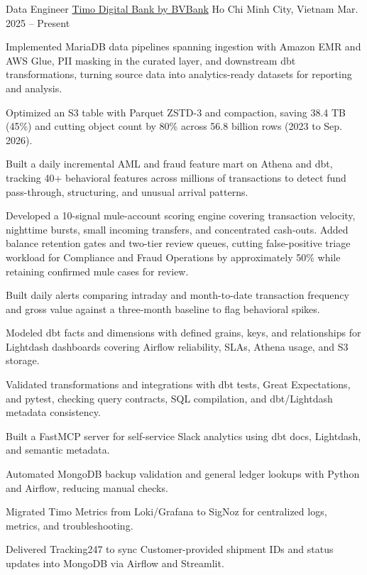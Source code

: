 
\begin{cventries}
  \cventry
    {Data Engineer}
    {\href{https://timo.vn}{Timo Digital Bank by BVBank}}
    {Ho Chi Minh City, Vietnam}
    {Mar. 2025 -- Present}
    {
      \begin{cvitems}
        \item {Implemented MariaDB data pipelines spanning ingestion with Amazon EMR and AWS Glue, PII masking in the curated layer, and downstream dbt transformations, turning source data into analytics-ready datasets for reporting and analysis.}
        \item {Optimized an S3 table with Parquet ZSTD-3 and compaction, saving 38.4 TB (45\%) and cutting object count by 80\% across 56.8 billion rows (2023 to Sep. 2026).}
        \item {Built a daily incremental AML and fraud feature mart on Athena and dbt, tracking 40+ behavioral features across millions of transactions to detect fund pass-through, structuring, and unusual arrival patterns.}
        \item {Developed a 10-signal mule-account scoring engine covering transaction velocity, nighttime bursts, small incoming transfers, and concentrated cash-outs. Added balance retention gates and two-tier review queues, cutting false-positive triage workload for Compliance and Fraud Operations by approximately 50\% while retaining confirmed mule cases for review.}
        \item {Built daily alerts comparing intraday and month-to-date transaction frequency and gross value against a three-month baseline to flag behavioral spikes.}
        \item {Modeled dbt facts and dimensions with defined grains, keys, and relationships for Lightdash dashboards covering Airflow reliability, SLAs, Athena usage, and S3 storage.}
        \item {Validated transformations and integrations with dbt tests, Great Expectations, and pytest, checking query contracts, SQL compilation, and dbt/Lightdash metadata consistency.}
        \item {Built a FastMCP server for self-service Slack analytics using dbt docs, Lightdash, and semantic metadata.}
        \item {Automated MongoDB backup validation and general ledger lookups with Python and Airflow, reducing manual checks.}
        \item {Migrated Timo Metrics from Loki/Grafana to SigNoz for centralized logs, metrics, and troubleshooting.}
        \item {Delivered Tracking247 to sync Customer-provided shipment IDs and status updates into MongoDB via Airflow and Streamlit.}
      \end{cvitems}
    }
\end{cventries}
